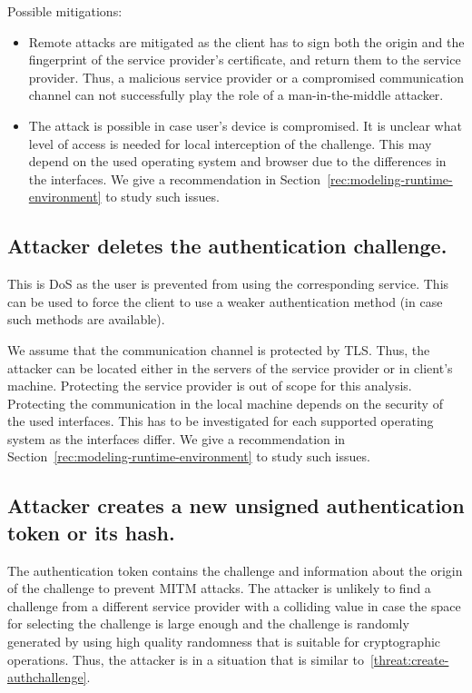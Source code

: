 Possible mitigations:
\begin{itemize}
\item Remote attacks are mitigated as the client has to sign both the origin and the fingerprint of the service provider's certificate, and return them to the service provider. Thus, a malicious service provider or a compromised communication channel can not successfully play the role of a man-in-the-middle attacker.

\item The attack is possible in case user's device is compromised. It is unclear what level of access is needed for local interception of the challenge. This may depend on the used operating system and browser due to the differences in the interfaces. We give a recommendation in Section~\ref{rec:modeling-runtime-environment} to study such issues.
\end{itemize}


\subsection{Attacker deletes the authentication challenge.}
\label{threat:delete-authchallenge}
This is DoS as the user is prevented from using the corresponding service. This can be used to force the client to use a weaker authentication method (in case such methods are available).

We assume that the communication channel is protected by TLS. Thus, the attacker can be located either in the servers of the service provider or in client's machine. Protecting the service provider is out of scope for this analysis. Protecting the communication in the local machine depends on the security of the used interfaces. This has to be investigated for each supported operating system as the interfaces differ. We give a recommendation in Section~\ref{rec:modeling-runtime-environment} to study such issues.




\subsection{Attacker creates a new unsigned authentication token or its hash.}
\label{threat:create-authtoken}
The authentication token contains the challenge and information about the origin of the challenge to prevent MITM attacks. The attacker is unlikely to find a challenge from a different service provider with a colliding value in case the space for selecting the challenge is large enough and the challenge is randomly generated by using high quality randomness that is suitable for cryptographic operations. Thus, the attacker is in a situation that is similar to~\ref{threat:create-authchallenge}.

